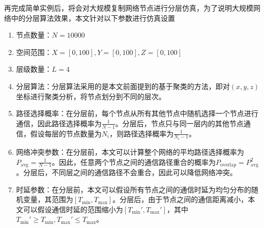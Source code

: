 \documentclass[UTF8,a4paper,12pt]{ctexart}
\numberwithin{equation}{section}
\begin{document}
	再完成简单实例后，将会对大规模复制网络节点进行分层仿真，为了说明大规模网络中的分层算法效果，本文针对以下参数进行仿真设置
	\begin{enumerate}
		\item 节点数量：$N = 10000$
		\item 空间范围：$X = [0, 100], Y = [0, 100], Z = [0, 100]$
		\item 层级数量：$L = 4$
		\item 分层算法：分层算法采用的是本文前面提到的基于聚类的方法，即对$(x, y, z)$坐标进行聚类分析，将节点划分到不同的层次。
		\item 路径选择概率：在分层前，每个节点从所有其他节点中随机选择一个节点进行通信，因此路径选择概率为$\frac{1}{N-1}$。分层后，节点只与同一层内的其他节点通信，假设每层的节点数量为$N_i$，则路径选择概率为$\frac{1}{N_i-1}$。
		\item 网络冲突参数：在分层前，本文可以计算整个网络的平均路径选择概率为$P_{\text{avg}} = \frac{1}{N-1}$。因此，任意两个节点之间的通信路径重合的概率为$P_{\text{overlap}} = P_{\text{avg}}^2$。分层后，不同层之间的通信路径不会重合，因此可以降低网络冲突。
		\item 时延参数：在分层前，本文可以假设所有节点之间的通信时延为均匀分布的随机变量，其范围为$[T_{\text{min}}, T_{\text{max}}]$。分层后，由于节点之间的通信距离减小，本文可以假设通信时延的范围缩小为$[T_{\text{min}}', T_{\text{max}}']$，其中$T_{\text{min}}' \ge T_{\text{min}}, T_{\text{max}}' \le T_{\text{max}}$。
	\end{enumerate}
	\begin{figure}[H] 
	\end{figure}
	
\end{document}
